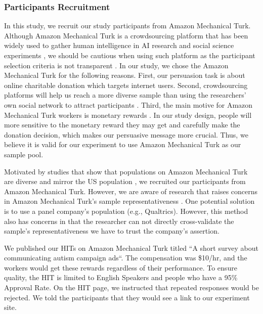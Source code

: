 
\subsubsection{Participants Recruitment}
In this study, we recruit our study participants from Amazon Mechanical Turk. Although Amazon Mechanical Turk is a crowdsourcing platform that has been widely used to gather human intelligence in AI research and social science experiments \cite{ paolacci2014inside,berinsky2012evaluating,buhrmester2011amazon}, we should be cautious when using such platform as the participant selection criteria is not transparent \cite{landers2015inconvenient,paolacci2010running}. In our study, we chose the Amazon Mechanical Turk for the following reasons. First, our persuasion task is about online charitable donation which targets internet users. Second, crowdsourcing platforms will help us reach a more diverse sample than using the researchers' own social network to attract participants \cite{buhrmester2011amazon}. Third, the main motive for Amazon Mechanical Turk workers is monetary rewards \cite{berinsky2012evaluating}. In our study design, people will more sensitive to the monetary reward they may get and carefully make the donation decision, which makes our persuasive message more crucial. Thus, we believe it is valid for our experiment to use Amazon Mechanical Turk as our sample pool. 

Motivated by studies that show that populations on Amazon Mechanical Turk are diverse and mirror the US population \cite{buhrmester2011amazon,behrend2011viability,berinsky2012evaluating}, we recruited our participants from Amazon Mechanical Turk. However, we are aware of research that raises concerns in Amazon Mechanical Turk's sample representativeness \cite{landers2015inconvenient,paolacci2010running}. One potential solution is to use a panel company's population (e.g., Qualtrics). However, this method also has concerns in that the researcher can not directly cross-validate the sample's representativeness we have to trust the company's assertion. 

We published our HITs on Amazon Mechanical Turk titled ``A short survey about communicating autism campaign ads``. The compensation was \$10/hr, and the workers would get these rewards regardless of their performance. To ensure quality, the HIT is limited to English Speakers and people who have a 95\% Approval Rate. On the HIT page, we instructed that repeated responses would be rejected. We told the participants that they would see a link to our experiment site. 
